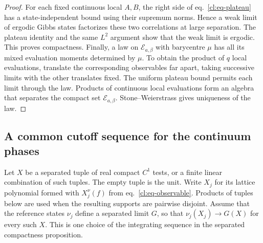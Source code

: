 \documentclass[11pt,letterpaper,reqno]{amsart}
\numberwithin{equation}{section}
\renewcommand{\eqref}[1]{\textup{eq.~\ref{#1}}}
\theoremstyle{definition}
\theoremstyle{remark}
\begin{document}
\begin{proof}
For each fixed continuous local \(A,B\), the right side of
\eqref{cl:eq-plateau} has a state-independent bound using
their supremum norms. Hence a weak limit of ergodic Gibbs
states factorizes these two correlations at large separation.
The plateau identity and the same \(L^2\) argument show that
the weak limit is ergodic. This proves compactness.
Finally, a law on \(\mathcal E_{a,\beta}\) with barycentre
\(\mu\) has all its mixed evaluation moments determined by
\(\mu\). To obtain the product of \(q\) local evaluations,
translate the corresponding observables far apart, taking
successive limits with the other translates fixed.
The uniform plateau bound permits each limit through the
law. Products of continuous local evaluations form an algebra
that separates the compact set \(\mathcal E_{a,\beta}\).
Stone--Weierstrass gives uniqueness of the law.
\end{proof}

\subsection{A common cutoff sequence for the continuum phases}

Let \(X\) be a separated tuple of real compact \(C^1\) tests,
or a finite linear combination of such tuples.
The empty tuple is the unit.
Write \(X_j\) for its lattice polynomial formed with
\(X_j^\nu(f)\) from \eqref{cl:eq-observable}. Products of
tuples below are used when the resulting supports are
pairwise disjoint. Assume that the reference states
\(\nu_j\) define a separated limit \(G\), so that
\(\nu_j(X_j)\to G(X)\) for every such \(X\). This is one
choice of the integrating sequence in the separated
compactness proposition.
\end{document}

